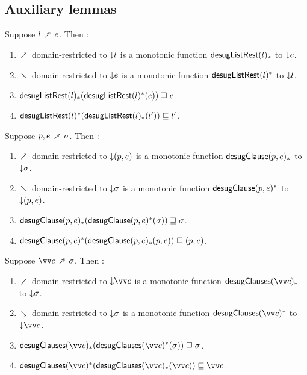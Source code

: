 \subsection{Auxiliary lemmas}

\begin{lemma}
  \label{lem:aux:desugarlistrest:gc}
  Suppose $l \dfwdarrow e$. Then :
  \begin{enumerate}
     \item $\dfwdarrow$ domain-restricted to ${\downarrow}{l}$ is a monotonic function $\mathsf{desugListRest}(l)_*$ to ${\downarrow}{e}$.
     \item $\dbwdarrow$ domain-restricted to ${\downarrow}{e}$ is a monotonic function $\mathsf{desugListRest}(l)^*$ to ${\downarrow}{l}$.
     \item $\mathsf{desugListRest}(l)_*(\mathsf{desugListRest}(l)^*(e)) \sqsupseteq e$.
     \item $\mathsf{desugListRest}(l)^*(\mathsf{desugListRest}(l)_*(l')) \sqsubseteq l'$.
  \end{enumerate}
\end{lemma}
\begin{lemma}
  \label{lem:aux:clause:gc}
  Suppose $p, e \dfwdarrow \sigma$. Then :
  \begin{enumerate}
     \item $\dfwdarrow$ domain-restricted to ${\downarrow}{(p, e)}$ is a monotonic function $\mathsf{desugClause}(p, e)_*$ to ${\downarrow}{\sigma}$.
     \item $\dbwdarrow$ domain-restricted to ${\downarrow}{\sigma}$ is a monotonic function $\mathsf{desugClause}(p, e)^*$ to ${\downarrow}{(p, e)}$.
     \item $\mathsf{desugClause}(p, e)_*(\mathsf{desugClause}(p, e)^*(\sigma)) \sqsupseteq \sigma$.
     \item $\mathsf{desugClause}(p, e)^*(\mathsf{desugClause}(p, e)_*(p, e)) \sqsubseteq (p, e)$.
  \end{enumerate}
\end{lemma}
\begin{lemma}
  \label{lem:aux:clauses:gc}
  Suppose $\vec{c} \dfwdarrow \sigma$. Then :
  \begin{enumerate}
     \item $\dfwdarrow$ domain-restricted to $\Below{\vec{c}}$ is a monotonic function $\desugarClausesFwdF{\vec{c}}$ to ${\downarrow}{\sigma}$.
     \item $\dbwdarrow$ domain-restricted to ${\downarrow}{\sigma}$ is a monotonic function $\desugarClausesBwdF{\vec{c}}$ to $\Below{\vec{c}}$.
     \item $\desugarClausesFwdF{\vec{c}}(\desugarClausesBwdF{\vec{c}}(\sigma)) \geq \sigma$.
     \item $\desugarClausesBwdF{\vec{c}}(\desugarClausesFwdF{\vec{c}}(\vec{c})) \leq \vec{c}$.
  \end{enumerate}
\end{lemma}
